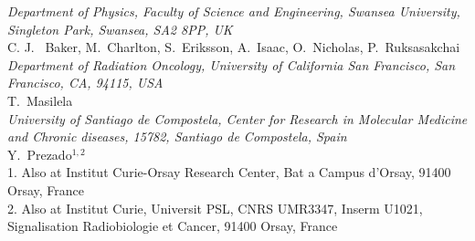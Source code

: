 \noindent \textit{Department of Physics, Faculty of Science and Engineering, Swansea University, Singleton Park, Swansea, SA2 8PP, UK} \\
C. J. ~Baker, M.~Charlton, S.~Eriksson, A.~Isaac, O.~Nicholas, P.~Ruksasakchai \\
 
\noindent \textit{Department of Radiation Oncology, University of California San Francisco, San Francisco, CA, 94115, USA} \\
T.~Masilela \\
 
\noindent \textit{University of Santiago de Compostela, Center for Research in Molecular Medicine and Chronic diseases, 15782, Santiago de Compostela, Spain} \\
Y.~Prezado$^{1, 2}$ \\
{\footnotesize
  1. Also at Institut Curie-Orsay Research Center, Bat a Campus d'Orsay, 91400 Orsay, France \\
  2. Also at Institut Curie, Universit PSL, CNRS UMR3347, Inserm U1021, Signalisation Radiobiologie et Cancer, 91400 Orsay, France \\
}
 
\vspace{0.5cm}
